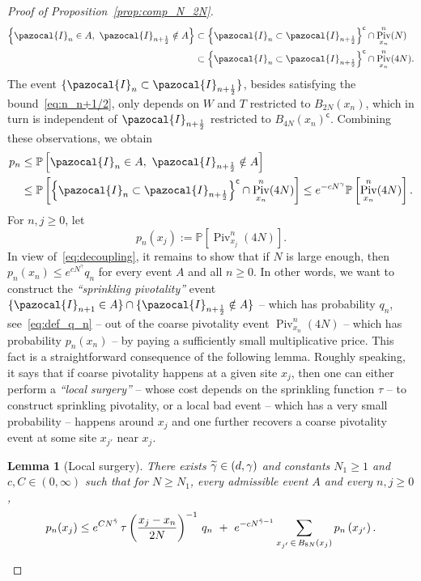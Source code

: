 \documentclass[10pt]{amsart}
\newtheorem{lemm}[theo]{Lemma}\newtheorem{prop}[theo]{Proposition}\newtheorem{coro}[theo]{Corollary}\newtheorem{conj}[theo]{Conjecture}
\theoremstyle{definition}\newtheorem{defi}[theo]{Definition}\newtheorem{rema}[theo]{Remark}\newtheorem{exam}[theo]{Example}\newtheorem{exem}[theo]{Example}\newtheorem{nota}[theo]{Notation}
\DeclareMathOperator{\Piv}{Piv}
\renewcommand{\P}{\mathbb{P}}
\newcommand{\sfc}{\mathsf{c}}
\let\oldtilde\tilde
\renewcommand*{\tilde}[1]{\mathchoice{\widetilde{#1}}{\widetilde{#1}}{\oldtilde{#1}}{\oldtilde{#1}}}
\begin{document}
\begin{proof}[Proof of Proposition~\ref{prop:comp_N_2N}]
\begin{align*}
\left\{\pazocal{I}_n\in A,~\pazocal{I}_{n+\frac12}\notin A\right\} &\subset \left\{\pazocal{I}_{n}\subset \pazocal{I}_{n+\frac12}\right\}^{\sfc} \cap \Piv^{n}_{x_n}(N) \\
&\subset \left\{\pazocal{I}_{n}\subset \pazocal{I}_{n+\frac12}\right\}^{\sfc} \cap \Piv^{n}_{x_n}(4N).
\end{align*}
The event $\{\pazocal{I}_{n}\subset \pazocal{I}_{n+\frac12}\}$, besides satisfying the bound~\eqref{eq:n_n+1/2}, only depends on $W$ and $T$ restricted to $B_{2N}(x_n)$, which in turn is independent of $\pazocal{I}_{n+\frac12}$ restricted to $B_{4N}(x_n)^{\sfc}$. Combining these observations, we obtain
\begin{align}\label{eq:decoupling}
\begin{split}
p_n&\leq\P\left[\pazocal{I}_n\in A,~\pazocal{I}_{n+\frac12}\notin A\right] \\
&\leq \P\left[\left\{\pazocal{I}_{n}\subset \pazocal{I}_{n+\frac12}\right\}^{\sfc}\cap\Piv^{n}_{x_n}(4N)\right] \leq e^{-cN^\gamma} \P\left[\Piv^{n}_{x_n}(4N)\right].
\end{split}
\end{align}
For $n,j\geq0$, let
\begin{equation}
p_n(x_j):=\P\left[\Piv^{n}_{x_j}(4N)\right].
\end{equation}
In view of~\eqref{eq:decoupling}, it remains to show that if $N$ is large enough, then $p_n(x_n)\leq e^{cN^\gamma}q_n$ for every event $A$ and all $n\geq0$. In other words, we want to construct the \emph{``sprinkling pivotality''} event $\{\pazocal{I}_{n+1}\in A\}\cap \{\pazocal{I}_{n+\frac12}\notin A\}$ -- which has probability $q_n$, see~\eqref{eq:def_q_n} -- out of the coarse pivotality event $\Piv^n_{x_n}(4N)$ -- which has probability $p_n(x_n)$ -- by paying a sufficiently small multiplicative price. This fact is a straightforward consequence of the following lemma. Roughly speaking, it says that if coarse pivotality happens at a given site $x_j$, then one can either perform a \emph{``local surgery''} -- whose cost depends on the sprinkling function $\tau$ -- to construct sprinkling pivotality, or a local bad event -- which has a very small probability -- happens around $x_j$ and one further recovers a coarse pivotality event at some site $x_{j'}$ near $x_j$.

\begin{lemm}[Local surgery]\label{lem:conv_bound}
There exists $\tilde{\gamma}\in(d,\gamma)$ and constants $N_1\geq1$ and $c,C\in(0,\infty)$ such that for $N\geq N_1$, every admissible event $A$ and every $n,j\geq0$,
\begin{equation}\label{eq:conv_bound}
p_n(x_j)\leq e^{CN^{\tilde{\gamma}}}\, \tau\left(\frac{x_j-x_n}{2N}\right)^{-1} \,q_n~+~e^{-cN^{\tilde{\gamma}-1}} \sum_{x_{j'}\,\in\, B_{8N}(x_j)} p_n\left(x_{j'}\right).
\end{equation}
\end{lemm}


\end{proof}
\end{document}
